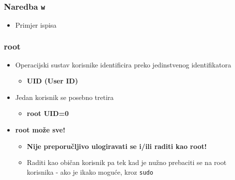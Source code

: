 \documentclass[table,usenames,dvipsnames] {beamer}
\newcommand{\shell}[1]{\texttt{#1}}
\begin{document}
\begin{frame}[t]
\frametitle{Naredba \shell{w}}
\begin{itemize}
  \item Primjer ispisa
    \begin{table}[h]\footnotesize
    \end{table}
\end{itemize}
\end{frame}

\begin{frame}[t]
\frametitle{root} 
\begin{itemize}
  \item Operacijski sustav korisnike identificira preko jedinstvenog identifikatora
  \begin{itemize}
	  \item[] \textbf{UID (User ID)}
  \end{itemize}
\end{itemize}
\begin{itemize}
  \item Jedan korisnik se posebno tretira 
  \begin{itemize}
    \item[] \bf{root} \hspace{2em} UID=0
  \end{itemize}
\end{itemize}
\begin{itemize}
  \item \textbf{root može sve!}
  \begin{itemize}
    \item \textbf{Nije preporučljivo ulogiravati se i/ili raditi kao root!}
    \item Raditi kao običan korisnik pa tek kad je nužno prebaciti se na 
          root korisnika - ako je ikako moguće, kroz \shell{sudo}
  \end{itemize}
\end{itemize}
\end{frame}
\end{document}
